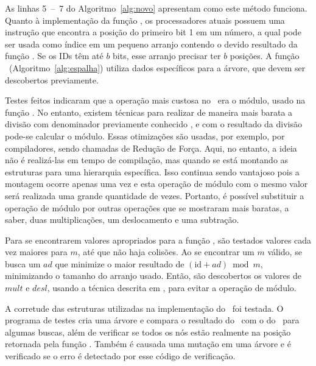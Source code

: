 As linhas 5~--~7 do Algoritmo~\ref{alg:novo} apresentam como este método funciona.
Quanto à implementação da função \bpn, os processadores atuais possuem uma instrução que encontra a posição do primeiro bit 1 em um número, a qual pode ser usada como índice em um pequeno arranjo contendo o devido resultado da função \bpn.
Se os IDs têm até $b$ bits, esse arranjo precisar ter $b$ posições.
A função \Espalha\ (Algoritmo~\ref{alg:espalha}) utiliza dados específicos para a árvore, que devem ser descobertos previamente.

Testes feitos indicaram que a operação mais custosa no \Novo\ era o módulo, usado na função \Espalha.
No entanto, existem técnicas para realizar de maneira mais barata a divisão com denominador previamente conhecido \cite{reciproco}, e com o resultado da divisão pode-se calcular o módulo.
Essas otimizações são usadas, por exemplo, por compiladores, sendo chamadas de Redução de Força.
Aqui, no entanto, a ideia não é realizá-las em tempo de compilação, mas quando se está montando as estruturas para uma hierarquia específica.
Isso continua sendo vantajoso pois a montagem ocorre apenas uma vez e esta operação de módulo com o mesmo valor será realizada uma grande quantidade de vezes.
Portanto, é possível substituir a operação de módulo por outras operações que se mostraram mais baratas, a saber, duas multiplicações, um deslocamento e uma subtração.

Para se encontrarem valores apropriados para a função \Espalha, são testados valores cada vez maiores para $m$, até que não haja colisões.
Ao se encontrar um $m$ válido, se busca um $\mathit{ad}$ que minimize o maior resultado de $(\mathrm{id} + \mathit{ad}) \bmod m$, minimizando o tamanho do arranjo usado.
Então, são descobertos os valores de $\mathit{mult}$ e $\mathit{desl}$, usando a técnica descrita em , para evitar a operação de módulo.

A corretude das estruturas utilizadas na implementação do \Novo\ foi testada.
O programa de testes cria uma árvore e compara o resultado do \Simples\ com o do \Novo\ para algumas buscas, além de verificar se todos os nós estão realmente na posição retornada pela função \Espalha.
Também é causada uma mutação em uma árvore e é verificado se o erro é detectado por esse código de verificação.



